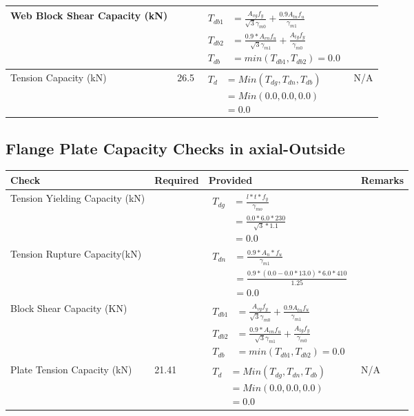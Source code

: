 \documentclass{article}%
\begin{document}
\begin{longtable}{|p{4cm}|p{6cm}|p{5.5cm}|p{1.5cm}|}
\hline%
Web Block Shear Capacity (kN)&&$\begin{aligned}T_{db1} &= \frac{A_{vg} f_{y}}{\sqrt{3} \gamma_{m0}} + \frac{0.9 A_{tn} f_{u}}{\gamma_{m1}}\\ T_{db2} &= \frac{0.9*A_{vn} f_{u}}{\sqrt{3} \gamma_{m1}} + \frac{A_{tg} f_{y}}{\gamma_{m0}}\\ T_{db} &= min(T_{db1}, T_{db2})= 0.0\end{aligned}$&\\%
\hline%
Tension Capacity (kN)&26.5&$\begin{aligned} T_d &= Min(T_{dg},T_{dn},T_{db})\\ &= Min(0.0,0.0,0.0)\\ &=0.0\end{aligned}$&N/A\\%
\hline%
\end{longtable}

%
\subsection{Flange Plate Capacity Checks in axial{-}Outside }%
\label{subsec:FlangePlateCapacityChecksinaxial{-}Outside}%
\renewcommand{\arraystretch}{1.2}%
\begin{longtable}{|p{4cm}|p{6cm}|p{5.5cm}|p{1.5cm}|}%
\hline%
\rowcolor{OsdagGreen}%
Check&Required&Provided&Remarks\\%
\hline%
\endhead%
\hline%
Tension Yielding Capacity (kN)&&$\begin{aligned} T_{dg} &= \frac{l*t*f_y}{\gamma_{mo}}\\ &=\frac{0.0*6.0*230}{\sqrt{3}*1.1}\\ &=0.0\end{aligned}$&\\%
\hline%
Tension Rupture Capacity(kN)&&$\begin{aligned} T_{dn} &= \frac{0.9*A_{n}*f_u}{\gamma_{m1}}\\ &=\frac{0.9*(0.0-0.0*13.0)*6.0*410}{1.25}\\ &=0.0\end{aligned}$&\\%
\hline%
Block Shear Capacity (KN)&&$\begin{aligned}T_{db1} &= \frac{A_{vg} f_{y}}{\sqrt{3} \gamma_{m0}} + \frac{0.9 A_{tn} f_{u}}{\gamma_{m1}}\\ T_{db2} &= \frac{0.9*A_{vn} f_{u}}{\sqrt{3} \gamma_{m1}} + \frac{A_{tg} f_{y}}{\gamma_{m0}}\\ T_{db} &= min(T_{db1}, T_{db2})= 0.0\end{aligned}$&\\%
\hline%
Plate Tension Capacity  (kN)&21.41&$\begin{aligned} T_d &= Min(T_{dg},T_{dn},T_{db})\\ &= Min(0.0,0.0,0.0)\\ &=0.0\end{aligned}$&N/A\\%
\hline%
\end{longtable}
\end{document}
